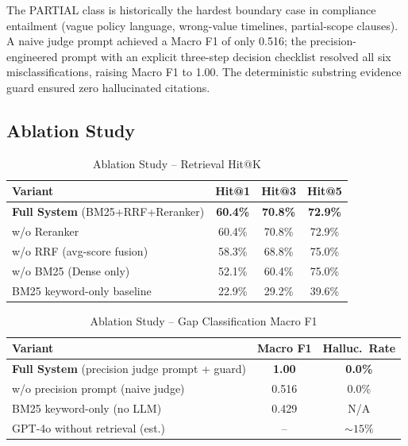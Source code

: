 \documentclass[conference, a4paper]{IEEEtran}
\begin{document}
The PARTIAL class is historically the hardest boundary case in compliance entailment (vague policy
language, wrong-value timelines, partial-scope clauses). A naive judge prompt achieved a
Macro F1 of only 0.516; the precision-engineered prompt with an explicit three-step decision
checklist resolved all six misclassifications, raising Macro F1 to 1.00. The deterministic
substring evidence guard ensured zero hallucinated citations.

\subsection{Ablation Study}

\begin{table}[htbp]
\centering
\caption{Ablation Study -- Retrieval Hit@K}
\label{tab:ablation_retrieval}
\begin{tabularx}{\columnwidth}{>{\raggedright\arraybackslash}X c c c}
\toprule
\textbf{Variant} & \textbf{Hit@1} & \textbf{Hit@3} & \textbf{Hit@5} \\
\midrule
\textbf{Full System} (BM25+RRF+Reranker) & \textbf{60.4\%} & \textbf{70.8\%} & \textbf{72.9\%} \\
w/o Reranker & 60.4\% & 70.8\% & 72.9\% \\
w/o RRF (avg-score fusion) & 58.3\% & 68.8\% & 75.0\% \\
w/o BM25 (Dense only) & 52.1\% & 60.4\% & 75.0\% \\
BM25 keyword-only baseline & 22.9\% & 29.2\% & 39.6\% \\
\bottomrule
\end{tabularx}
\end{table}

\begin{table}[htbp]
\centering
\caption{Ablation Study -- Gap Classification Macro F1}
\label{tab:ablation_gap}
\begin{tabularx}{\columnwidth}{>{\raggedright\arraybackslash}X c c}
\toprule
\textbf{Variant} & \textbf{Macro F1} & \textbf{Halluc.\ Rate} \\
\midrule
\textbf{Full System} (precision judge prompt + guard) & \textbf{1.00} & \textbf{0.0\%} \\
w/o precision prompt (naive judge) & 0.516 & 0.0\% \\
BM25 keyword-only (no LLM) & 0.429 & N/A \\
GPT-4o without retrieval (est.) & -- & ${\sim}15\%$ \\
\bottomrule
\end{tabularx}
\end{table}
\end{document}
